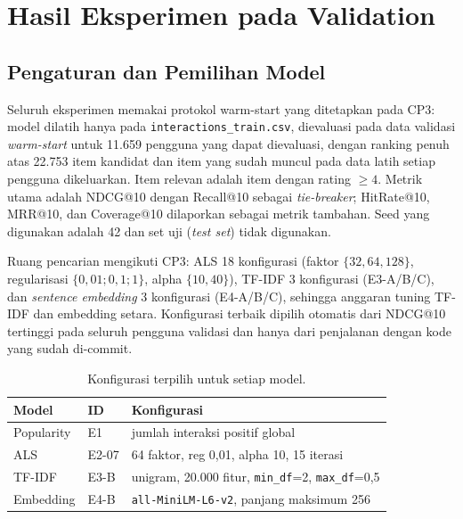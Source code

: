 %

\section{Hasil Eksperimen pada Validation}
\label{sec:results}

\subsection{Pengaturan dan Pemilihan Model}
Seluruh eksperimen memakai protokol warm-start yang ditetapkan pada CP3: model
dilatih hanya pada \texttt{interactions\_train.csv}, dievaluasi pada data
validasi \textit{warm-start} untuk 11.659 pengguna yang dapat dievaluasi, dengan
ranking penuh atas 22.753 item kandidat dan item yang sudah muncul pada data
latih setiap pengguna dikeluarkan. Item relevan adalah item dengan rating
$\geq 4$. Metrik utama adalah NDCG@10 dengan Recall@10 sebagai \textit{tie-breaker};
HitRate@10, MRR@10, dan Coverage@10 dilaporkan sebagai metrik tambahan. Seed
yang digunakan adalah 42 dan set uji (\textit{test set}) tidak digunakan.

Ruang pencarian mengikuti CP3: ALS 18 konfigurasi (faktor $\{32, 64, 128\}$,
regularisasi $\{0{,}01; 0{,}1; 1\}$, alpha $\{10, 40\}$), TF-IDF 3 konfigurasi
(E3-A/B/C), dan \textit{sentence embedding} 3 konfigurasi (E4-A/B/C), sehingga
anggaran tuning TF-IDF dan embedding setara. Konfigurasi terbaik dipilih otomatis
dari NDCG@10 tertinggi pada seluruh pengguna validasi dan hanya dari
penjalanan dengan kode yang sudah di-commit.

\begin{table}[t]
\centering
\caption{Konfigurasi terpilih untuk setiap model.}
\label{tab:selected}
\begin{tabular}{lll}
\hline
Model & ID & Konfigurasi \\
\hline
Popularity & E1 & jumlah interaksi positif global \\
ALS & E2-07 & 64 faktor, reg 0,01, alpha 10, 15 iterasi \\
TF-IDF & E3-B & unigram, 20.000 fitur, \texttt{min\_df}=2, \texttt{max\_df}=0,5 \\
Embedding & E4-B & \texttt{all-MiniLM-L6-v2}, panjang maksimum 256 \\
\hline
\end{tabular}
\end{table}

